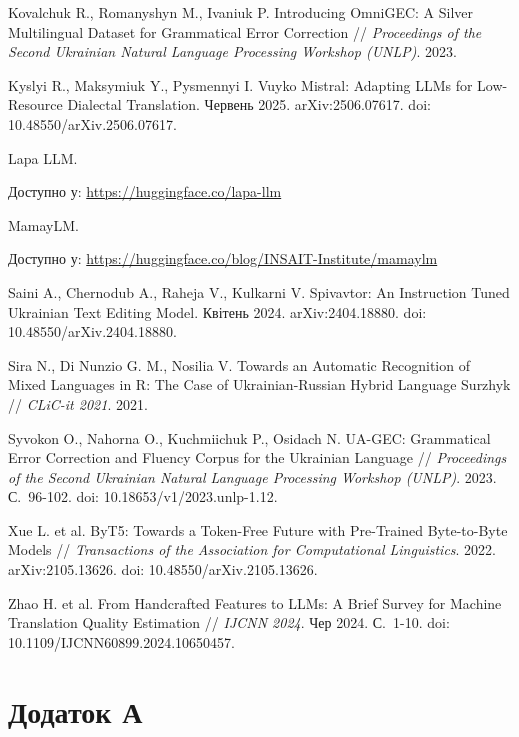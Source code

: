 \documentclass[14pt]{extarticle}
\let\oldaddcontentsline\addcontentsline
\renewcommand{\addcontentsline}[3]{\phantomsection\oldaddcontentsline{#1}{#2}{#3}}
\begin{document}
\begin{reflist}
  \item \label{ref:omniGEC} Kovalchuk R., Romanyshyn M., Ivaniuk P. Introducing OmniGEC: A Silver Multilingual Dataset for Grammatical Error Correction // \textit{Proceedings of the Second Ukrainian Natural Language Processing Workshop (UNLP)}. 2023.
  \item \label{ref:vuykoMistral} Kyslyi R., Maksymiuk Y., Pysmennyi I. Vuyko Mistral: Adapting LLMs for Low-Resource Dialectal Translation. Червень 2025. arXiv:2506.07617. doi: 10.48550/arXiv.2506.07617.
  \item \label{ref:lapallm} Lapa LLM.\par Доступно у: \url{https://huggingface.co/lapa-llm}
  \item \label{ref:mamaylm} MamayLM.\par Доступно у: \url{https://huggingface.co/blog/INSAIT-Institute/mamaylm}
  \item \label{ref:spivavtor} Saini A., Chernodub A., Raheja V., Kulkarni V. Spivavtor: An Instruction Tuned Ukrainian Text Editing Model. Квітень 2024. arXiv:2404.18880. doi: 10.48550/arXiv.2404.18880.
  \item \label{ref:siraSurzhyk} Sira N., Di Nunzio G. M., Nosilia V. Towards an Automatic Recognition of Mixed Languages in R: The Case of Ukrainian-Russian Hybrid Language Surzhyk // \textit{CLiC-it 2021}. 2021.
  \item \label{ref:uaGEC} Syvokon O., Nahorna O., Kuchmiichuk P., Osidach N. UA-GEC: Grammatical Error Correction and Fluency Corpus for the Ukrainian Language // \textit{Proceedings of the Second Ukrainian Natural Language Processing Workshop (UNLP)}. 2023. С.~96-102. doi: 10.18653/v1/2023.unlp-1.12.
  \item \label{ref:xue2022} Xue L. et al. ByT5: Towards a Token-Free Future with Pre-Trained Byte-to-Byte Models // \textit{Transactions of the Association for Computational Linguistics}. 2022. arXiv:2105.13626. doi: 10.48550/arXiv.2105.13626.
  \item \label{ref:zhao2024} Zhao H. et al. From Handcrafted Features to LLMs: A Brief Survey for Machine Translation Quality Estimation // \textit{IJCNN 2024}. Чер 2024. С.~1-10. doi: 10.1109/IJCNN60899.2024.10650457.
\end{reflist}

\clearpage

\section*{Додаток А}
\end{document}
